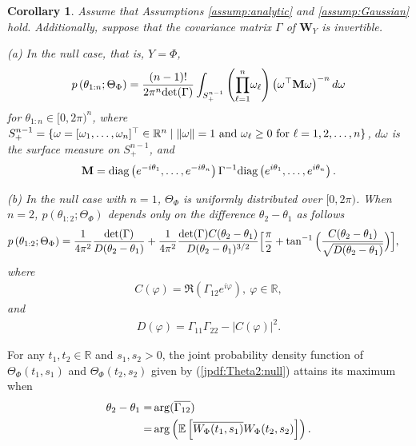 \documentclass{amsart}
\newtheorem{Corollary}{Corollary}
\begin{document}
\begin{Corollary}\label{corollary:phase:jpdf:null}
Assume that Assumptions \ref{assump:analytic} and \ref{assump:Gaussian} hold.
Additionally,
suppose that the covariance matrix $\Gamma$ of $\mathbf{W}_{Y}$
is invertible.


(a) In the null case, that is, $Y=\Phi$,
\begin{align*}
p\left(\theta_{1:n};\Theta_{\Phi}\right)
=
\frac{(n-1)!}{2\pi^{n}\textup{det}(\Gamma) }
\int_{S_{+}^{n-1}}
\left(\overset{n}{\underset{\ell=1}{\prod}}\omega_{\ell}\right)
\left(\omega^{\top}\mathbf{M}\omega\right)^{-n}d\omega
\end{align*}
for $\theta_{1:n}\in [0,2\pi)^n$, where
$S_{+}^{n-1}=
\{\omega=[\omega_{1},\ldots,\omega_{n}]^{\top}\in\mathbb{R}^{n}\mid \|\omega\|=1\ \textup{and}\ \omega_{\ell}\geq 0\ \textup{for}\ \ell=1,2,\ldots,n\}$,
$d\omega$ is the surface measure on $S_{+}^{n-1}$, and
\begin{align*}
\mathbf{M} = \textup{diag}\left(e^{-i\theta_1}, \dots, e^{-i\theta_n} \right)\Gamma^{-1} \textup{diag}\left(e^{i\theta_1}, \dots, e^{i\theta_n}\right).
\end{align*}




(b) In the null case with $n=1$, $\Theta_{\Phi}$ is uniformly distributed over $[0,2\pi)$. When $n=2$,
 $p\left(\theta_{1:2};\Theta_{\Phi}\right)$
depends only on the difference $\theta_{2}-\theta_{1}$ as follows
\begin{align}\label{jpdf:Theta2:null}
&p\left(\theta_{1:2};\Theta_{\Phi}\right)
=\frac{1 }{4\pi^{2}}\frac{\textup{det}(\Gamma)}{D(\theta_{2}-\theta_{1})}
+\frac{1 }{4\pi^{2}}\frac{\textup{det}(\Gamma)C(\theta_{2}-\theta_{1})}
{D(\theta_{2}-\theta_{1})^{3/2}}
\Big[\frac{\pi}{2}+
\tan^{-1}\Big(\frac{C(\theta_{2}-\theta_{1})}
{\sqrt{D(\theta_{2}-\theta_{1})}}
\Big)\Big],
\end{align}
where
\begin{align*}
C(\varphi)=\Re(\Gamma_{12}e^{i\varphi}),\ \varphi\in \mathbb{R},
\end{align*}
and
\begin{align*}
D(\varphi)= \Gamma_{11}\Gamma_{22}-|C(\varphi)|^2.
\end{align*}
\end{Corollary}
For any $t_{1},t_{2}\in \mathbb{R}$ and $s_{1},s_{2}>0$, the joint probability density function of $\Theta_{\Phi}(t_{1},s_{1})$ and $\Theta_{\Phi}(t_{2},s_{2})$ given by (\ref{jpdf:Theta2:null})
attains its maximum when
\begin{align}\notag
\theta_{2} - \theta_{1} =& \arg(\overline{\Gamma_{12}}) \\\label{observation_phase}=&\arg\left(\mathbb{E}\left[\overline{W_{\Phi}(t_{1},s_{1})}W_{\Phi}(t_{2},s_{2})\right]\right).
\end{align}
\end{document}
